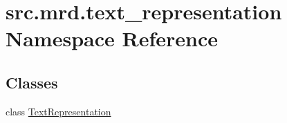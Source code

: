 \hypertarget{namespacesrc_1_1mrd_1_1text__representation}{\section{src.\+mrd.\+text\+\_\+representation Namespace Reference}
\label{namespacesrc_1_1mrd_1_1text__representation}
}
\subsection*{Classes}
\begin{DoxyCompactItemize}
\item 
class \hyperlink{classsrc_1_1mrd_1_1text__representation_1_1_text_representation}{Text\+Representation}
\end{DoxyCompactItemize}
